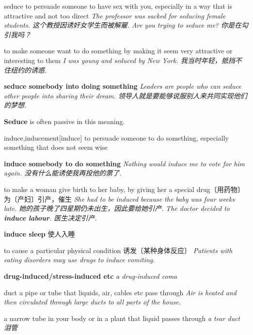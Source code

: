 \begin{DefWord}{seduce}
    to persuade someone to have sex with you, especially in a way that is attractive and not too direct
    \textit{The professor was sacked for seducing female students. 这个教授因诱奸女学生而被解雇. }
    \textit{Are you trying to seduce me? 你是在勾引我吗？}

    to make someone want to do something by making it seem very attractive or interesting to them
    \textit{I was young and seduced by New York. 我当时年轻，抵挡不住纽约的诱惑. }

    \textbf{seduce somebody into doing something}
    \textit{Leaders are people who can seduce other people into sharing their dream. 领导人就是要能够说服别人来共同实现他们的梦想. }

    \begin{remark}
        \textbf{Seduce} is often passive in this meaning.
    \end{remark}
\end{DefWord}

\begin{DefWord}{induce,inducement}[induce]
    to persuade someone to do something, especially something that does not seem wise

    \textbf{induce somebody to do something}
    \textit{Nothing would induce me to vote for him again. 没有什么能诱使我再投他的票了. }

    to make a woman give birth to her baby, by giving her a special drug〔用药物〕为〔产妇〕引产，催生
    \textit{She had to be induced because the baby was four weeks late. 她的孩子晚了四星期仍未出生，因此要给她引产. }
    \textit{The doctor decided to \textbf{induce labour}. 医生决定引产. }

    \textbf{induce sleep} 使人入睡

    to cause a particular physical condition 诱发〔某种身体反应〕
    \textit{Patients with eating disorders may use drugs to induce vomiting.}

    \textbf{drug-induced/stress-induced etc}
    \textit{a drug-induced coma}
\end{DefWord}

\begin{DefWord}{duct}
    a pipe or tube that liquids, air, cables etc pass through
    \textit{Air is heated and then circulated through large ducts to all parts of the house.}

    a narrow tube in your body or in a plant that liquid passes through
    \textit{a tear duct 泪管}
\end{DefWord}

